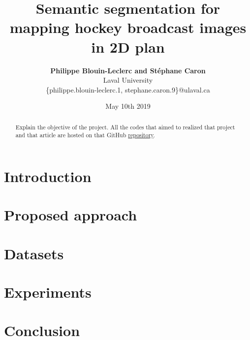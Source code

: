 \documentclass[10pt,letterpaper]{article}
\title{{\huge \bf Semantic segmentation for mapping hockey broadcast images in 2D plan}}
\author{{\bf Philippe Blouin-Leclerc and Stéphane Caron} \\ {Laval University} \\
{\{philippe.blouin-leclerc.1, stephane.caron.9\}}@ulaval.ca}
\date{May 10th 2019}
\numberwithin{equation}{section}
\begin{document}
\maketitle

\begin{multicols}{2}

\begin{abstract}
Explain the objective of the project. All the codes that aimed to realized that project and that article are hosted on that GitHub \href{https://github.com/stecaron/glo-7030-projet}{repository}.
\end{abstract}


\section{Introduction}




\section{Proposed approach}




\section{Datasets}




\section{Experiments}




\section{Conclusion}




\nocite{hastie01statisticallearning}



\setlength{\bibleftmargin}{.125in}
\setlength{\bibindent}{-\bibleftmargin}



\end{multicols}
\end{document}
